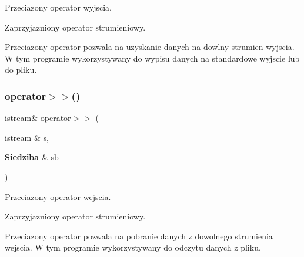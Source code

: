 Przeciazony operator wyjscia. 

Zaprzyjazniony operator strumieniowy.

Przeciazony operator pozwala na uzyskanie danych na dowlny strumien wyjscia. W tym programie wykorzystywany do wypisu danych na standardowe wyjscie lub do pliku. \mbox{\label{_siedziba_8h_ae5ef581c1d198741a15a44ad17c0960b}} 
\subsubsection{operator$>$$>$()}
{\footnotesize\ttfamily istream\& operator$>$$>$ (\begin{DoxyParamCaption}\item[{istream \&}]{s,  }\item[{\textbf{ Siedziba} \&}]{sb }\end{DoxyParamCaption})}



Przeciazony operator wejscia. 

Zaprzyjazniony operator strumieniowy.

Przeciazony operator pozwala na pobranie danych z dowolnego strumienia wejscia. W tym programie wykorzystywany do odczytu danych z pliku. 